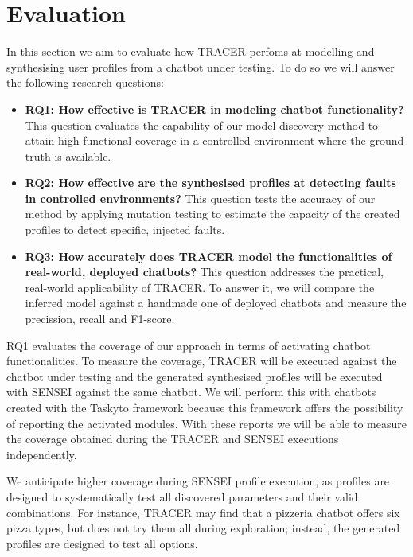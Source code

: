 
\chapter{Evaluation}\label{chapter:evaluation}

In this section we aim to
evaluate how \ac{TRACER} perfoms at
modelling and synthesising user profiles
from a chatbot under testing.
To do so we will answer the following research questions:

\begin{itemize}
\item \textbf{RQ1: How effective is TRACER in modeling chatbot functionality?}
  This question evaluates the capability of our model discovery method to attain high functional coverage in a controlled environment where the ground truth is available.
\item \textbf{RQ2: How effective are the synthesised profiles at detecting faults in controlled environments?}
  This question tests the accuracy of our method by applying mutation testing \autocite{gomez-abajoMutationTestingTaskOriented2024} to estimate the capacity of the created profiles to detect specific, injected faults.
\item \textbf{RQ3: How accurately does TRACER model the functionalities of real-world, deployed chatbots?}
  This question addresses the practical, real-world applicability of \ac{TRACER}.
  To answer it, we will compare the inferred model against a handmade one
  of deployed chatbots
  and measure the precission, recall and F1-score.
\end{itemize}

RQ1 evaluates the coverage of our approach
in terms of activating chatbot functionalities.
To measure the coverage, \ac{TRACER} will be executed
against the chatbot under testing
and the generated synthesised profiles
will be executed with SENSEI against the same chatbot.
We will perform this with chatbots created with the Taskyto framework
because this framework offers the possibility
of reporting the activated modules.
With these reports we will be able to measure
the coverage obtained during the \ac{TRACER} and SENSEI executions independently.

We anticipate higher coverage during SENSEI profile execution,
as profiles are designed to systematically test all discovered parameters
and their valid combinations.
For instance, \ac{TRACER} may find that a pizzeria chatbot
offers six pizza types, but does not try them all during exploration;
instead, the generated profiles are designed to test all options.

